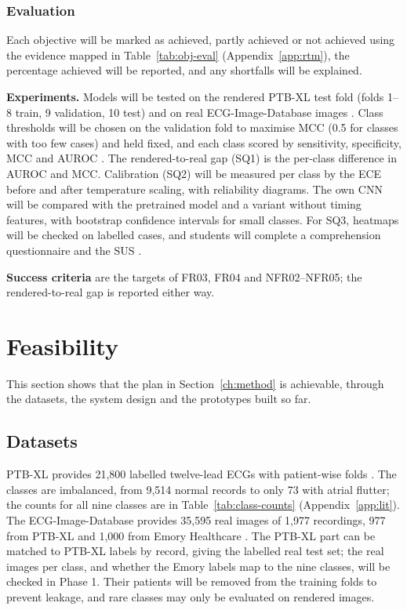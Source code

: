 \documentclass[12pt,nonacm,acmlarge,titlepage,screen]{acmart}
\begin{document}
\subsubsection{Evaluation}
\label{sec:eval}

Each objective will be marked as achieved, partly achieved or not achieved using the evidence mapped in Table~\ref{tab:obj-eval} (Appendix~\ref{app:rtm}), the percentage achieved will be reported, and any shortfalls will be explained.

\textbf{Experiments.} Models will be tested on the rendered PTB-XL test fold (folds 1--8 train, 9 validation, 10 test) \cite{wagner_ptbxl_2020} and on real ECG-Image-Database images \cite{reyna_ecg-image-database_2024}. Class thresholds will be chosen on the validation fold to maximise MCC (0.5 for classes with too few cases) and held fixed, and each class scored by sensitivity, specificity, MCC and AUROC \cite{chicco_advantages_2020}. The rendered-to-real gap (SQ1) is the per-class difference in AUROC and MCC. Calibration (SQ2) will be measured per class by the ECE before and after temperature scaling, with reliability diagrams. The own CNN will be compared with the pretrained model and a variant without timing features, with bootstrap confidence intervals for small classes. For SQ3, heatmaps will be checked on labelled cases, and students will complete a comprehension questionnaire and the SUS \cite{brooke_sus_1996}.

\textbf{Success criteria} are the targets of FR03, FR04 and NFR02--NFR05; the rendered-to-real gap is reported either way.

\section{Feasibility}
\label{ch:feasibility}

This section shows that the plan in Section~\ref{ch:method} is achievable, through the datasets, the system design and the prototypes built so far.

\subsection{Datasets}
\label{sec:datasets}

PTB-XL provides 21,800 labelled twelve-lead ECGs with patient-wise folds \cite{wagner_ptbxl_2020}. The classes are imbalanced, from 9,514 normal records to only 73 with atrial flutter; the counts for all nine classes are in Table~\ref{tab:class-counts} (Appendix~\ref{app:lit}). The ECG-Image-Database provides 35,595 real images of 1,977 recordings, 977 from PTB-XL and 1,000 from Emory Healthcare \cite{reyna_ecg-image-database_2024}. The PTB-XL part can be matched to PTB-XL labels by record, giving the labelled real test set; the real images per class, and whether the Emory labels map to the nine classes, will be checked in Phase 1. Their patients will be removed from the training folds to prevent leakage, and rare classes may only be evaluated on rendered images.
\end{document}
